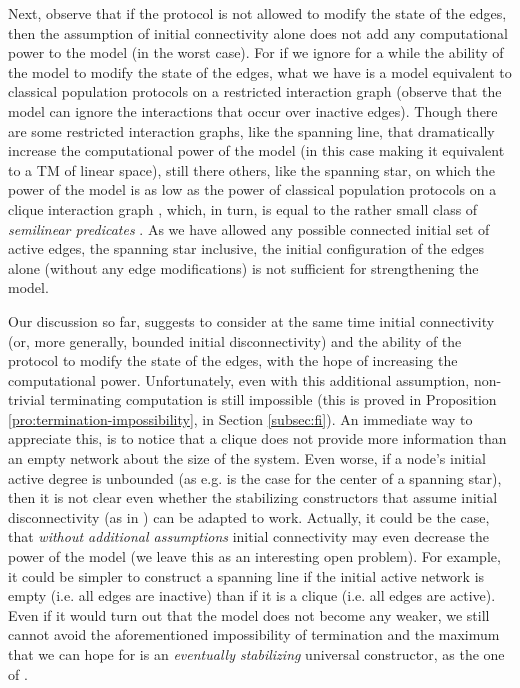 \documentclass[preprint]{elsarticle}
\begin{document}
Next, observe that if the protocol is not allowed to modify the state of the edges, then the assumption of initial connectivity alone does not add any computational power to the model (in the worst case). For if we ignore for a while the ability of the model to modify the state of the edges, what we have is a model equivalent to classical population protocols \cite{AADFP06} on a restricted interaction graph \cite{AACFJP05} (observe that the model can ignore the interactions that occur over inactive edges). Though there are some restricted interaction graphs, like the spanning line, that dramatically increase the computational power of the model (in this case making it equivalent to a TM of linear space), still there others, like the spanning star, on which the power of the model is as low as the power of classical population protocols on a clique interaction graph \cite{CMNS13}, which, in turn, is equal to the rather small class of \emph{semilinear predicates} \cite{AAER07}. As we have allowed any possible connected initial set of active edges, the spanning star inclusive, the initial configuration of the edges alone (without any edge modifications) is not sufficient for strengthening the model.

Our discussion so far, suggests to consider at the same time initial connectivity (or, more generally, bounded initial disconnectivity) and the ability of the protocol to modify the state of the edges, with the hope of increasing the computational power. Unfortunately, even with this additional assumption, non-trivial terminating computation is still impossible (this is proved in Proposition \ref{pro:termination-impossibility}, in Section \ref{subsec:fi}). An immediate way to appreciate this, is to notice that a clique does not provide more information than an empty network about the size of the system. Even worse, if a node's initial active degree is unbounded (as e.g. is the case for the center of a spanning star), then it is not clear even whether the stabilizing constructors that assume initial disconnectivity (as in \cite{MS14}) can be adapted to work. Actually, it could be the case, that \emph{without additional assumptions} initial connectivity may even decrease the power of the model (we leave this as an interesting open problem). For example, it could be simpler to construct a spanning line if the initial active network is empty (i.e. all edges are inactive) than if it is a clique (i.e. all edges are active). Even if it would turn out that the model does not become any weaker, we still cannot avoid the aforementioned impossibility of termination and the maximum that we can hope for is an \emph{eventually stabilizing} universal constructor, as the one of \cite{MS14}. 
\end{document}
